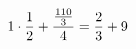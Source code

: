 \documentclass[preview]{standalone}
\begin{document}
\begin{align*}
\special{dvisvgm:raw <g id='unique000'>}1 \cdot \frac{1}{2} + \frac{\frac{110}{3}}{4} = \frac{2}{3} + 9\special{dvisvgm:raw </g>}
\end{align*}
\end{document}

